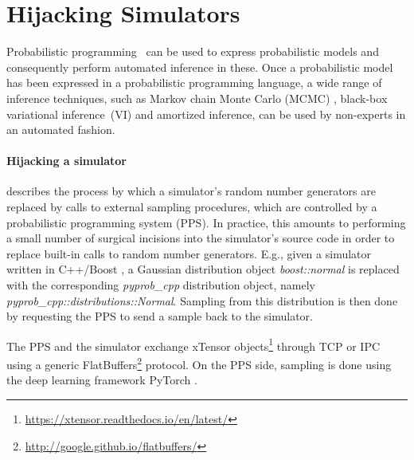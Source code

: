 \documentclass{article}
\begin{document}



\section{Hijacking Simulators}
\label{sec:hijackingsimulators}

 Probabilistic programming~\cite{gordon2014probabilistic,staton2016semantics,kozen1979semantics} 
can be used to express probabilistic models and consequently perform automated inference in these. Once a probabilistic model has been expressed in a probabilistic programming language, a wide range of inference techniques, such as Markov chain Monte Carlo (MCMC) \cite{geyer1992practical}, black-box variational inference~(VI) \cite{ranganath2014black} and amortized inference\cite{le2016inference}, can be used by non-experts in an automated fashion. 
 
\paragraph{Hijacking a simulator} describes the process by which a simulator's random number generators are replaced by calls to external sampling procedures, which are controlled by a probabilistic programming system (PPS). In practice, this amounts to performing a small number of surgical incisions into the simulator's source code in order to replace built-in calls to random number generators. E.g., given a simulator written in C++/Boost \cite{schaling2011boost}, a Gaussian distribution object \textit{boost::normal} is replaced with the corresponding \textit{pyprob\_cpp} distribution object, namely \textit{pyprob\_cpp::distributions::Normal}. Sampling from this distribution is then done by requesting the PPS to send a sample back to the simulator.

The PPS and the simulator exchange xTensor objects\footnote{\url{https://xtensor.readthedocs.io/en/latest/}} through TCP or IPC using a generic FlatBuffers\footnote{\url{http://google.github.io/flatbuffers/}} protocol. On the PPS side, sampling is done using the deep learning framework PyTorch \cite{paszke2017automatic}.
\end{document}
